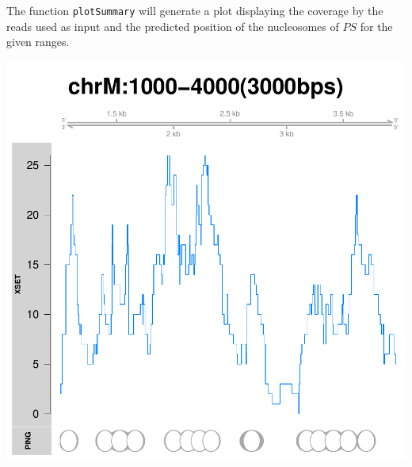 \documentclass[11pt]{article}
\begin{document}
\vspace{10pt}
The function \texttt{plotSummary} will generate a plot displaying the coverage
by the reads used as input and the predicted position of the
nucleosomes of $PS$ for the given ranges.

\begin{Schunk}
\end{Schunk}
\includegraphics{PING-PE-plotSummary}
\end{document}
